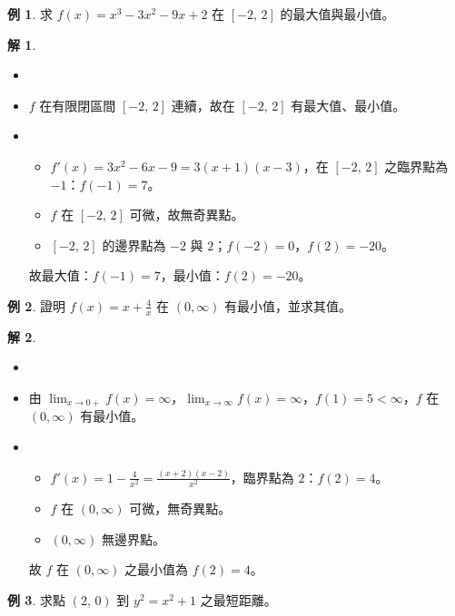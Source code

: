 \documentclass[12pt]{extarticle}
\newcommand{\ds}{\displaystyle}
\theoremstyle{definition}
\newtheorem*{ex}{例}
\newtheorem*{sol}{解}
\begin{document}
\begin{ex}
  求 $f(x) = x^3 - 3 x^2 - 9x + 2$ 在 $[-2,\,2]$ 的最大值與最小值。
\end{ex}

\begin{sol}
  \begin{itemize}\setlength\itemsep{0em}
    \item[]
    \item $f$ 在有限閉區間 $[-2,\,2]$ 連續，故在 $[-2,\,2]$ 有最大值、最小值。
    \item 
      \begin{itemize}\setlength\itemsep{0em}
        \item $\ds f'(x) = 3 x^2 - 6 x - 9 = 3(x + 1)(x - 3)$，在 $[-2,\,2]$ 之臨界點為 $-1$：$f(-1) = 7$。
        \item $f$ 在 $[-2,\,2]$ 可微，故無奇異點。
        \item $[-2,\,2]$ 的邊界點為 $-2$ 與 $2$；$f(-2) = 0$，$f(2) = -20$。
      \end{itemize}
      故最大值：$f(-1) = 7$，最小值：$f(2) = -20$。
  \end{itemize}
\end{sol}

\begin{ex}
  證明 $\ds f(x) = x + \frac{4}{x}$ 在 $\ds (0, \infty)$ 有最小值，並求其值。
\end{ex}

\begin{sol}
  \begin{itemize}\setlength\itemsep{0em}
    \item[]
    \item 由 $\ds\lim_{x\to 0+}f(x) = \infty$，$\ds\lim_{x\to\infty}f(x) = \infty$，$f(1) = 5 < \infty$，$f$ 在 $(0, \infty)$ 有最小值。
    \item 
      \begin{itemize}\setlength\itemsep{0em}
        \item $\ds f'(x) = 1 - \frac{4}{x^2} = \frac{(x + 2)(x - 2)}{x^2}$，臨界點為 $2$：$f(2) = 4$。
        \item $f$ 在 $(0, \infty)$ 可微，無奇異點。
        \item $(0, \infty)$ 無邊界點。
      \end{itemize}
      故 $f$ 在 $(0, \infty)$ 之最小值為 $f(2) = 4$。
  \end{itemize}
\end{sol}

\begin{ex}
  求點 $(2,\,0)$ 到 $y^2 = x^2 + 1$ 之最短距離。
\end{ex}
\end{document}
